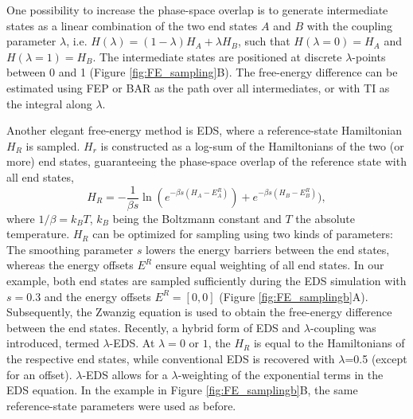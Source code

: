 One possibility to increase the phase-space overlap is to generate intermediate states as a linear combination of the two end states $A$ and $B$ with the coupling parameter $\lambda$, i.e. $H(\lambda) = (1-\lambda) H_A + \lambda H_B$, such that $H(\lambda=0) = H_A$ and $H(\lambda=1) = H_B$.
The intermediate states are positioned at discrete $\lambda$-points between 0 and 1 (Figure \ref{fig:FE_sampling}B).\cite{Valleau1972, Straatsma1991} 
The free-energy difference can be estimated using FEP\cite{Zwanzig1954} or BAR\cite{Bennett1976} as the path over all intermediates, or with TI\cite{Kirkwood1935} as the integral along $\lambda$. 

Another elegant free-energy method is EDS,\cite{Christ2007, Christ2008} where a reference-state Hamiltonian $H_R$ is sampled. $H_r$ is constructed as a log-sum of the Hamiltonians of the two (or more) end states, guaranteeing the phase-space overlap of the reference state with all end states,
\begin{equation}
H_R = - \frac{1}{\beta s} \ln( e^{- \beta s (H_A - E^R_A)}) +e^{- \beta s (H_B - E^R_B)}),
\end{equation}
where $1/\beta=k_{B}T$, $k_B$ being the Boltzmann constant and $T$ the absolute temperature.
$H_R$ can be optimized for sampling using two kinds of parameters: The smoothing parameter $s$ lowers the energy barriers between the end states, whereas the energy offsets $E^R$ ensure equal weighting of all end states. In our example, both end states are sampled sufficiently during the EDS simulation with $s=0.3$ and the energy offsets $E^R=[0,0]$ (Figure \ref{fig:FE_samplingb}A). Subsequently, the Zwanzig equation\cite{Zwanzig1954} is used to obtain the free-energy difference between the end states.\cite{Christ2007, Christ2008}
Recently, a hybrid form of EDS and $\lambda$-coupling was introduced, termed $\lambda$-EDS.\cite{Koenig2020} At $\lambda=0$ or $1$, the $H_R$ is equal to the Hamiltonians of the respective end states, while conventional EDS is recovered with $\lambda$=0.5 (except for an offset).\cite{Koenig2020}
$\lambda$-EDS allows for a $\lambda$-weighting of the exponential terms in the EDS equation. In the example in Figure \ref{fig:FE_samplingb}B, the same reference-state parameters were used as before.

